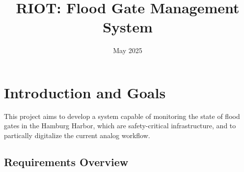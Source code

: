 \documentclass[
]{article}
\title{RIOT: Flood Gate Management System}
\author{}
\date{May 2025}
\begin{document}
\maketitle

\section{}

\hypertarget{section-introduction-and-goals}{%
\section{Introduction and Goals}\label{section-introduction-and-goals}}
This project aims to develop a system capable of monitoring the state of flood gates in the Hamburg Harbor, which are safety-critical infrastructure, and to partically digitalize the current analog workflow.

\hypertarget{_requirements_overview}{%
\subsection{Requirements Overview}\label{_requirements_overview}}
\end{document}
